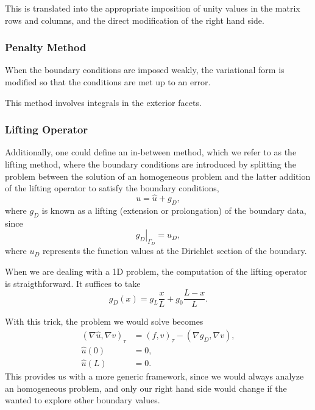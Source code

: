 \documentclass[../main.tex]{subfiles}
\begin{document}
This is translated into the appropriate imposition of unity values in the matrix rows and columns, and the direct modification of the right hand side.


\subsubsection{Penalty Method}
When the boundary conditions are imposed weakly, the variational form is modified so that the conditions are met up to an error.

This method involves integrals in the exterior facets.

\subsubsection{Lifting Operator}
Additionally, one could define an in-between method, which we refer to as the lifting method, where the boundary conditions are introduced by splitting the problem between the solution of an homogeneous problem and the latter addition of the lifting operator to satisfy the boundary conditions,
\begin{equation}
    u = \hat{u} + g_D,
\end{equation}
where $g_D$ is known as a lifting (extension or prolongation) of the boundary data, since
\begin{equation}
    \left.g_D\right|_{\Gamma_D} = u_D,
\end{equation} 
where $u_D$ represents the function values at the Dirichlet section of the boundary. 

When we are dealing with a 1D problem, the computation of the lifting operator is straigthforward.
It suffices to take
\begin{equation}
    g_D(x) = g_L \frac{x}{L} + g_0 \frac{L-x}{L}.
\end{equation}

With this trick, the problem we would solve becomes
\begin{subequations}
    \begin{align}
        (\nabla \hat{u}, \nabla v)_\tau &= (f, v)_\tau - (\nabla g_D, \nabla v), \\
        \hat{u}(0) &= 0, \\
        \hat{u}(L) &= 0.
    \end{align}
\end{subequations}
This provides us with a more generic framework, since we would always analyze an homogeneous problem, and only our right hand side would change if the wanted to explore other boundary values.
\end{document}
